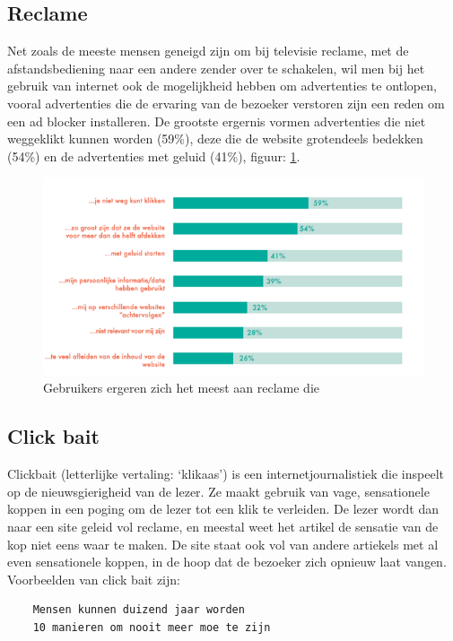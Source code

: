 \documentclass[pdftex,a4paper,12pt,twoside]{report}
\begin{document}
\subsection{Reclame}
\label{sec Reclame}
Net zoals de meeste mensen geneigd zijn om bij televisie reclame, met de afstandsbediening naar een andere zender over te schakelen, wil men bij het gebruik van internet ook de mogelijkheid hebben om advertenties te ontlopen, vooral advertenties die de ervaring van de bezoeker verstoren zijn een reden om een ad blocker installeren. De grootste ergernis vormen advertenties die niet weggeklikt kunnen worden (59\%), deze die de website grotendeels bedekken (54\%) en de advertenties met geluid (41\%), figuur: \ref{fig: Redenadblockreclame}.
\begin{figure}[h!]
\centering
\includegraphics[width=12cm]{img/Redenadblockreclame}
\caption{Gebruikers ergeren zich het meest aan reclame die}
\label{fig: Redenadblockreclame}
\end{figure}

\subsection{Click bait}
\label{sec click bait}
Clickbait (letterlijke vertaling: ‘klikaas’) is een internetjournalistiek die inspeelt op de nieuwsgierigheid van de lezer. Ze maakt gebruik van vage, sensationele koppen in een poging om de lezer tot een klik te verleiden. De lezer wordt dan naar een site geleid vol reclame, en meestal weet het artikel de sensatie van de kop niet eens waar te maken. De site staat ook vol van andere artiekels met al even sensationele koppen, in de hoop dat de bezoeker zich opnieuw laat vangen.
\\
Voorbeelden van click bait zijn:
\begin{lstlisting}
	Mensen kunnen duizend jaar worden
	10 manieren om nooit meer moe te zijn
\end{lstlisting}
\end{document}
